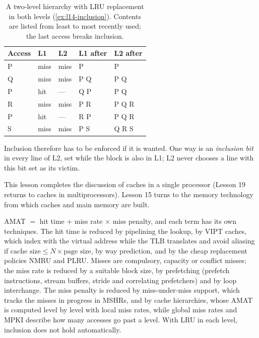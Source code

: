 \documentclass[../main.tex]{subfiles}
\begin{document}
\begin{table}[htbp]
  \centering\small
  \caption{A two-level hierarchy with LRU replacement in both levels
    (\cref{ex:l14-inclusion}).  Contents are listed from least to most
    recently used; the last access breaks inclusion.}
  \label{tab:l14-inclusion}
  \begin{tabular}{@{}lllll@{}}
    \toprule
    Access & L1   & L2   & L1 after & L2 after \\
    \midrule
    P      & miss & miss & P        & P \\
    Q      & miss & miss & P Q      & P Q \\
    P      & hit  & ---  & Q P      & P Q \\
    R      & miss & miss & P R      & P Q R \\
    P      & hit  & ---  & R P      & P Q R \\
    S      & miss & miss & P S      & Q R S \\
    \bottomrule
  \end{tabular}
\end{table}

Inclusion therefore has to be enforced if it is wanted.  One way is an
\emph{inclusion bit} in every line of L2, set while the block is also in L1;
L2 never chooses a line with this bit set as its victim.

This lesson completes the discussion of caches in a single processor
(Lesson 19 returns to caches in multiprocessors).  Lesson 15 turns to the
memory technology from which caches and main memory are built.

\begin{keypoint}
  AMAT $=$ hit time $+$ miss rate $\times$ miss penalty, and each term has its
  own techniques.  The hit time is reduced by pipelining the lookup, by VIPT
  caches, which index with the virtual address while the TLB translates and
  avoid aliasing if $\text{cache size} \le N \times \text{page size}$, by way
  prediction, and by the cheap replacement policies NMRU and PLRU.  Misses
  are compulsory, capacity or conflict misses; the miss rate is reduced by a
  suitable block size, by prefetching (prefetch instructions, stream buffers,
  stride and correlating prefetchers) and by loop interchange.  The miss
  penalty is reduced by miss-under-miss support, which tracks the misses in
  progress in MSHRs, and by cache hierarchies, whose AMAT is computed level
  by level with local miss rates, while global miss rates and MPKI describe
  how many accesses go past a level.  With LRU
  in each level, inclusion does not hold automatically.
\end{keypoint}
\end{document}

